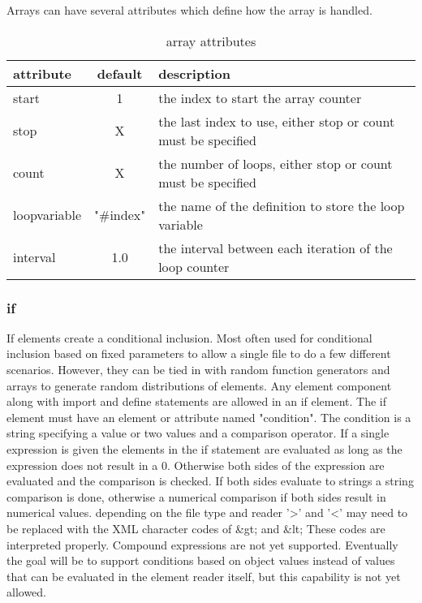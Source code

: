 \documentclass[12pt]{article} %
\begin{document}
 


 Arrays can have several attributes which define how the array is handled.
  \begin{table}[ht]

      \caption{array attributes} %
      \centering %
      \begin{tabular}{l c p{8cm}} %
          \hline %
          attribute & default & description \\ [0.5ex] %
          \hline %
          start & 1 & the index to start the array counter \\ %
          stop & X  & the last index to use, either stop or count must be specified\\
          count & X & the number of loops, either stop or count must be specified \\
          loopvariable& "\#index"& the name of the definition to store the loop variable \\
          interval & 1.0 & the interval between each iteration of the loop counter  \\

          \hline %
      \end{tabular}
      \label{table:arrayAttributes}
  \end{table}

 \subsubsection{if}
 If elements create a conditional inclusion.  Most often used for conditional inclusion based on fixed parameters to allow a single file to do a few different scenarios. However, they can be tied in with random function generators and arrays to generate random distributions of elements.  Any element component along with import and define statements are allowed in an if element.
 The if element must have an element or attribute named "condition".  The condition is a string specifying a value or two values and a comparison operator.  If a single expression is given the elements in the if statement are evaluated as long as the expression does not result in a 0.  Otherwise both sides of the expression are evaluated and the comparison is checked.  If both sides evaluate to strings a string comparison is done, otherwise a numerical comparison if both sides result in numerical values.   depending on the file type and reader '>' and '<' may need to be replaced with the XML character codes of \&gt; and \&lt;  These codes are interpreted properly.  Compound expressions are not yet supported.  Eventually the goal will be to support conditions based on object values instead of values that can be evaluated in the element reader itself, but this capability is not yet allowed.
\end{document}
